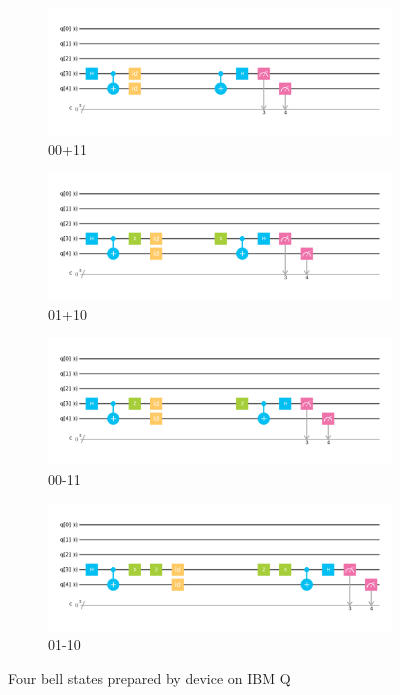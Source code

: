 \documentclass[letterpaper]{article}
\numberwithin{equation}{section} %
\numberwithin{figure}{section} %
\numberwithin{table}{section} %
\begin{document}
\begin{figure}
	\centering
	
	\begin{subfigure}[b]{0.8\textwidth}
		\includegraphics[width=\textwidth]{C00}
		\caption{00+11}
		\label{C00}
	\end{subfigure}
	
	\begin{subfigure}[b]{0.8\textwidth}
		\includegraphics[width=\textwidth]{C01}
		\caption{01+10}
		\label{C01}
	\end{subfigure}
	
	\begin{subfigure}[b]{0.8\textwidth}
		\includegraphics[width=\textwidth]{C10}
		\caption{00-11}
		\label{C10}
	\end{subfigure}
	
	\begin{subfigure}[b]{0.8\textwidth}
		\includegraphics[width=\textwidth]{C11}
		\caption{01-10}
		\label{C11}
	\end{subfigure}
	
	\caption{Four bell states prepared by device on IBM Q}
	\label{4BS}
\end{figure}
\end{document}
